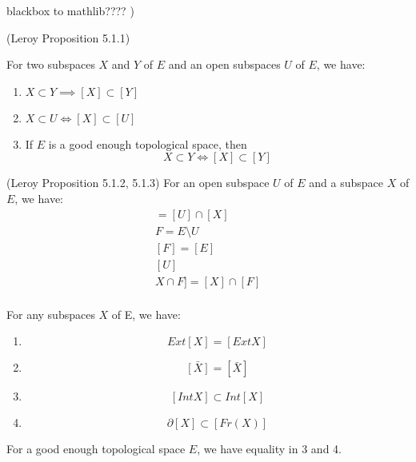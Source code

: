 \begin{definition}
    \label{def:good_enough_topological_space}
    blackbox to mathlib???? )
\end{definition}

\begin{lemma}
(Leroy Proposition 5.1.1)
    \label{lem:subset_to_sublocal_part_1}

    For two subspaces $X$ and $Y$ of $E$ and an open subspaces $U$ of $E$, we have:
    \begin{enumerate}
        \item $X \subset Y \implies [X] \subset [Y]$
        \item $X \subset U \iff [X] \subset [U]$
        \item If $E$ is a good enough topological space, then \[X \subset Y \iff [X] \subset [Y]\]
    \end{enumerate}
\end{lemma}

\begin{lemma}
(Leroy Proposition 5.1.2, 5.1.3)
    \label{lem:subset_to_sublocal_part_2}
    For an open subspace $U$ of $E$ and a subspace $X$ of $E$, we have:
    \begin{gather*}
    [U \cap X]
        = [U] \cap [X]\\
        F = E \setminus U\\
        [F] = [E] \\ [U]\\
        X \cap F] = [X] \cap [F]\\
    \end{gather*}

\end{lemma}


\begin{lemma}[Part 3]
    \label{lem:subspaces_part_3}
    For any subspaces $X$ of E, we have:
    \begin{enumerate}
        \item \[Ext[X] = [Ext X]\]
        \item \[\bar{[X]} = [\bar{X}]\]
        \item \[[Int X] \subset Int[X]\]
        \item \[\partial[X] \subset [Fr(X)]\]
    \end{enumerate}
    For a good enough topological space $E$, we have equality in 3 and 4.
\end{lemma}


